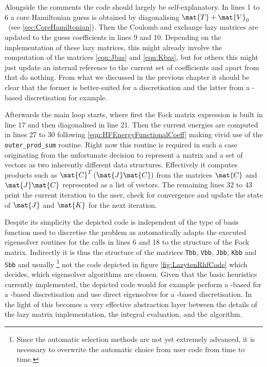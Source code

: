 Alongside the comments the code should largely be self-explanatory.
In lines 1 to 6 a core Hamiltonian guess is obtained by diagonalising
$\mat{T} + \mat{V}_0$~(see \ref{sec:CoreHamiltonian}).
Then the Coulomb and exchange lazy matrices
are updated to the guess coefficients in lines 9 and 10.
Depending on the implementation of these lazy matrices,
this might already involve the computation
of the matrices \eqref{eqn:Jbas} and \eqref{eqn:Kbas},
but for others this might just update an internal reference
to the current set of coefficients and apart from that do nothing.
From what we discussed in the previous chapter
it should be clear that the former is better-suited for a \cGTO
discretisation and the latter from a \FE-based discretisation for example.

Afterwards the main loop starts, where first the Fock matrix
expression is built in line 17 and then diagonalised in line 21.
Then the current energies are computed in lines 27 to 30
following \eqref{eqn:HFEnergyFunctionalCoeff} making
vivid use of the \texttt{outer\_prod\_sum} routine.
Right now this routine is required
in such a case originating from the unfortunate decision
to represent a matrix and a set of vectors as two inherently
different data structures.
Effectively it computes products such as
$\mat{C}^T \left(\mat{J} \mat{C}\right)$
from the matrices $\mat{C}$ and $\mat{J} \mat{C}$
represented as a list of vectors.
The remaining lines 32 to 43 print the current iteration
to the user, check for convergence and update the state
of $\mat{J}$ and $\mat{K}$ for the next iteration.

Despite its simplicity the depicted code is independent of
the type of basis function used to discretise the problem as
\lazyten automatically adapts the
executed eigensolver routines for the calls in lines 6 and 18
to the structure of the Fock matrix.
Indirectly it is thus the structure of the matrices
\texttt{Tbb}, \texttt{Vbb}, \texttt{Jbb}, \texttt{Kbb} and \texttt{Sbb}
and usually%
\footnote{Since the automatic selection methods are not yet extremely advanced,
it is necessary
to overwrite the automatic choice from user code from time to time.}
not the code depicted in figure \ref{fig:LazytenRhfCode}
which decides, which eigensolver algorithms are chosen.
Given that the basic heuristics currently implemented,
the depicted code would for example perform a \contraction-based \SCF
for a \CS-based discretisation and use direct eigensolves for a \cGTO-based
discretisation.
In the light of this \lazyten becomes a very effective
abstraction layer between the details of the lazy matrix implementation,
\ie the integral evaluation,
and the \SCF algorithm.

